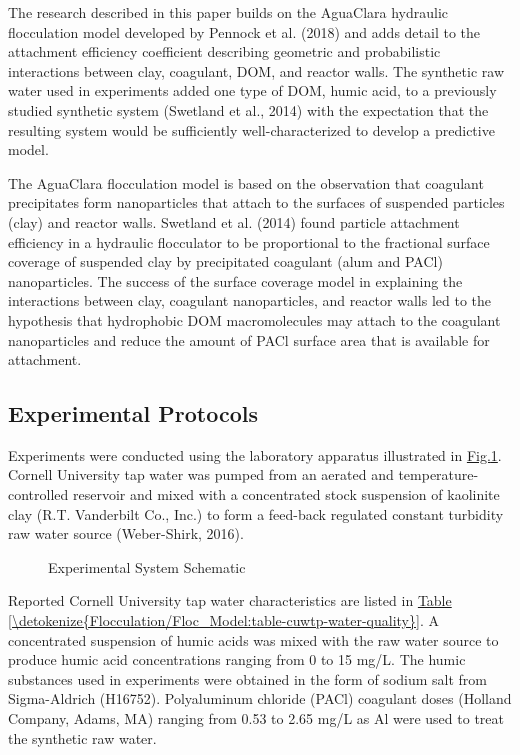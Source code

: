 \documentclass[letterpaper,10pt,english]{sphinxmanual}
\let\sphinxpxdimen\pdfpxdimen\else\newdimen\sphinxpxdimen
\begin{document}
The research described in this paper builds on the AguaClara hydraulic flocculation model developed by Pennock et al. (2018) and adds detail to the attachment efficiency coefficient describing geometric and probabilistic interactions between clay, coagulant, DOM, and reactor walls. The synthetic raw water used in experiments added one type of DOM, humic acid, to a previously studied synthetic system (Swetland et al., 2014) with the expectation that the resulting system would be sufficiently well-characterized to develop a predictive model.

The AguaClara flocculation model is based on the observation that coagulant precipitates form nanoparticles that attach to the surfaces of suspended particles (clay) and reactor walls. Swetland et al. (2014) found particle attachment efficiency in a hydraulic flocculator to be proportional to the fractional surface coverage of suspended clay by precipitated coagulant (alum and PACl) nanoparticles. The success of the surface coverage model in explaining the interactions between clay, coagulant nanoparticles, and reactor walls led to the hypothesis that hydrophobic DOM macromolecules may attach to the coagulant nanoparticles and reduce the amount of PACl surface area that is available for attachment.


\subsection{Experimental Protocols}
\label{\detokenize{Flocculation/Floc_Model:id29}}
Experiments were conducted using the laboratory apparatus illustrated in \hyperref[\detokenize{Flocculation/Floc_Model:figure-du-fig1}]{Fig.\@ \ref{\detokenize{Flocculation/Floc_Model:figure-du-fig1}}}. Cornell University tap water was pumped from an aerated and temperature-controlled reservoir and mixed with a concentrated stock suspension of kaolinite clay (R.T. Vanderbilt Co., Inc.) to form a feed-back regulated constant turbidity raw water source (Weber-Shirk, 2016).

\begin{figure}[htbp]
\centering
\capstart

\noindent\sphinxincludegraphics[width=400\sphinxpxdimen]{{Du_Fig1}.png}
\caption{Experimental System Schematic}\label{\detokenize{Flocculation/Floc_Model:id42}}\label{\detokenize{Flocculation/Floc_Model:figure-du-fig1}}\end{figure}

Reported Cornell University tap water characteristics are listed in \hyperref[\detokenize{Flocculation/Floc_Model:table-cuwtp-water-quality}]{Table \ref{\detokenize{Flocculation/Floc_Model:table-cuwtp-water-quality}}}. A concentrated suspension of humic acids was mixed with the raw water source to produce humic acid concentrations ranging from 0 to 15 mg/L. The humic substances used in experiments were obtained in the form of sodium salt from Sigma-Aldrich (H16752).  Polyaluminum chloride (PACl) coagulant doses (Holland Company, Adams, MA) ranging from 0.53 to 2.65 mg/L as Al were used to treat the synthetic raw water.
\end{document}
